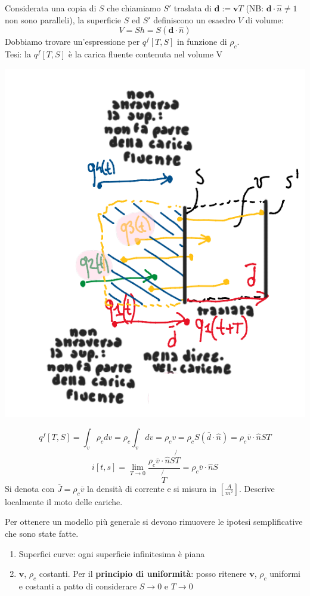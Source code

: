 Considerata una copia di $S$ che chiamiamo $S'$ traslata di $\mathbf{d} := \mathbf{v}T$ (NB: $\mathbf{d} \cdot \hat{n} \neq 1$ non sono paralleli), la superficie $S$ ed $S'$ definiscono un esaedro $V$ di volume: 
\[
V = S h = S (\mathbf{d} \cdot \hat{n})
\]
Dobbiamo trovare un'espressione per $q^f[T,S]$ in funzione di $\rho_c$.\\

Tesi: la $q^f[T,S]$ è la carica fluente contenuta nel volume V
\begin{center}
    \includegraphics[scale=0.5]{immagini/image2.png}
\end{center}
\[
    q^f[T,S] = \int_v \rho_cdv = \rho_c \int_v dv = \rho_cv = \rho_cS(\overline{d}\cdot\hat{n}) = \rho_c \overline{v}\cdot\hat{n}ST
\]
\[
i[t,s] = \lim_{T \to 0} \frac{\rho_c \overline{v}\cdot\hat{n}S\not{T}}{\not{T}} = \rho_c\overline{v}\cdot\hat{n}S
\]
Si denota con $\overline{J} = \rho_c\overline{v}$ la densità di corrente e si misura in $[\frac{A}{m^2}]$. Descrive localmente il moto delle cariche.


Per ottenere un modello più generale si devono rimuovere le ipotesi semplificative che sono state fatte.\\
\begin{enumerate}
    \item Superfici curve: ogni superficie infinitesima è piana
    \item $\mathbf{v}$, $\rho_c$ costanti. Per il \textbf{principio di uniformità}: posso ritenere $\mathbf{v}$, $\rho_c$ uniformi e costanti a patto di considerare $S\to0$ e $T\to0$
\end{enumerate}

